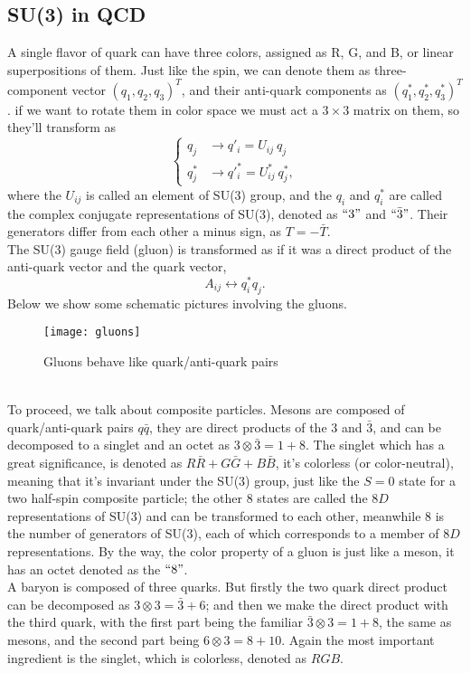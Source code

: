 \documentclass{article}
\newcommand{\be}{\begin{equation}}
\newcommand{\ee}{\end{equation}}
\renewcommand{\1}{\left}
\renewcommand{\2}{\right}
\begin{document}
\newpage
\subsection{SU(3) in QCD}
A single flavor of quark can have three colors, assigned as R, G, and B, or linear superpositions of them. Just like the spin, we can denote them as three-component vector $(q_1, q_2, q_3)^T$, and their anti-quark components as $(q^*_1, q^*_2, q^*_3)^T$. if we want to rotate them in color space we must act a $3\times 3$ matrix on them, so they'll transform as 
\be\1\{\begin{split}
q_j &\rightarrow q'_i=U_{ij}\ q_j\\
q^*_j &\rightarrow q'^*_i=U^*_{ij}\ q^*_j,
\end{split}\2.\ee
where the $U_{ij}$ is called an element of SU(3) group, and the $q_i$ and $q^*_i$ are called the complex conjugate representations of SU(3), denoted as $``3"$ and $``\bar 3"$. Their generators differ from each other a minus sign, as $T=-\bar T$.\\
The SU(3) gauge field (gluon) is transformed as if it was a direct product of the anti-quark vector and the quark vector,
\be
A_{ij} \longleftrightarrow q^*_i q_j.
\ee
Below we show some schematic pictures involving the gluons.
\begin{figure}[h]
\centering
\texttt{[image: gluons]}
\caption{Gluons behave like quark/anti-quark pairs}
\end{figure}\\

To proceed, we talk about composite particles. Mesons are composed of quark/anti-quark pairs $q\bar q$, they are direct products of the $3$ and $\bar 3$, and can be decomposed to a singlet and an octet as $3\otimes \bar 3=1+8$. The singlet which has a great significance, is denoted as $R\bar R+ G\bar G+B\bar B$, it's colorless (or color-neutral), meaning that it's invariant under the SU(3) group, just like the $S=0$ state for a two half-spin composite particle; the other $8$ states are called the $8D$ representations of SU(3) and can be transformed to each other, meanwhile $8$ is the number of generators of SU(3), each of which corresponds to a member of $8D$ representations. By the way, the color property of a gluon is just like a meson, it has an octet denoted as the $``8"$.\\

A baryon is composed of three quarks. But firstly the two quark direct product can be decomposed as $3\otimes 3=\bar 3+6$; and then we make the direct product with the third quark, with the first part being the familiar $\bar 3\otimes 3=1+8$, the same as mesons, and the second part being $6\otimes 3=8+10$. Again the most important ingredient is the singlet, which is colorless, denoted as $RGB$.\\
\end{document}
